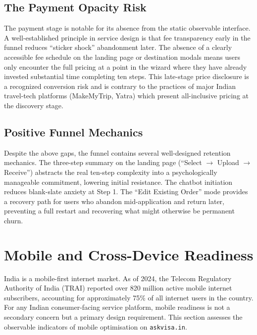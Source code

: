 \documentclass[journal, 10pt, twoside]{IEEEtran}
\begin{document}
\subsection{The Payment Opacity Risk}
The payment stage is notable for its absence from the static observable
interface. A well-established principle in service design is that fee
transparency early in the funnel reduces ``sticker shock'' abandonment
later. The absence of a clearly accessible fee schedule on the landing page
or destination modals means users only encounter the full pricing at a point
in the wizard where they have already invested substantial time completing
ten steps. This late-stage price disclosure is a recognized conversion risk
and is contrary to the practices of major Indian travel-tech platforms
(MakeMyTrip, Yatra) which present all-inclusive pricing at the discovery stage.

\subsection{Positive Funnel Mechanics}
Despite the above gaps, the funnel contains several well-designed
retention mechanics. The three-step summary on the landing page
(``Select $\rightarrow$ Upload $\rightarrow$ Receive'') abstracts the real
ten-step complexity into a psychologically manageable commitment, lowering
initial resistance. The chatbot initiation reduces blank-slate anxiety at
Step 1. The ``Edit Existing Order'' mode provides a recovery path for users
who abandon mid-application and return later, preventing a full restart
and recovering what might otherwise be permanent churn.

\section{Mobile and Cross-Device Readiness}
\label{sec:mobile}

India is a mobile-first internet market. As of 2024, the Telecom Regulatory
Authority of India (TRAI) reported over 820 million active mobile internet
subscribers, accounting for approximately 75\% of all internet users in the
country. For any Indian consumer-facing service platform, mobile readiness
is not a secondary concern but a primary design requirement. This section
assesses the observable indicators of mobile optimisation on
\texttt{askvisa.in}.
\end{document}
